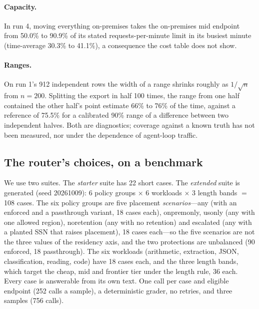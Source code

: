 \documentclass[11pt]{article}
\newcommand{\ubreak}{\textunderscore\allowbreak}
\newcommand{\code}[1]{{\ttfamily\let\_\ubreak #1}}
\begin{document}
\paragraph{Capacity.} In run 4, moving everything on-premises takes the on-premises mid endpoint
from 50.0\% to 90.9\% of its stated requests-per-minute limit in its busiest minute
(time-average 30.3\% to 41.1\%), a consequence the cost table does not show.

\paragraph{Ranges.} On run 1's 912 independent rows the width of a range shrinks roughly as
$1/\sqrt{n}$ from $n = 200$. Splitting the export in half 100 times, the range from one half
contained the other half's point estimate 66\% to 76\% of the time, against a reference of 75.5\%
for a calibrated 90\% range of a difference between two independent halves. Both are
diagnostics; coverage against a known truth has not been measured, nor under the dependence of
agent-loop traffic.

\subsection{The router's choices, on a benchmark}
\label{sec:bench}

We use two suites. The \emph{starter} suite has 22 short cases. The \emph{extended} suite is
generated (seed 20261009): 6 policy groups $\times$ 6 workloads $\times$ 3 length bands $=$ 108
cases. The six policy groups are five placement \emph{scenarios}---\code{any} (with an
\code{enforced} and a \code{passthrough} variant, 18 cases each), \code{onprem\_only},
\code{us\_only} (\code{any} with one allowed region), \code{no\_retention} (\code{any} with no
retention) and \code{escalated} (\code{any} with a planted SSN that raises placement), 18 cases
each---so the five scenarios are not the three values of the residency axis, and the two
protections are unbalanced (90 enforced, 18 passthrough). The six workloads (arithmetic,
extraction, JSON, classification, reading, code) have 18 cases each, and the three length bands,
which target the cheap, mid and frontier tier under the length rule, 36 each. Every case is
answerable from its own text. One call per case and eligible endpoint (252 calls a sample), a
deterministic grader, no retries, and three samples (756 calls).
\end{document}
